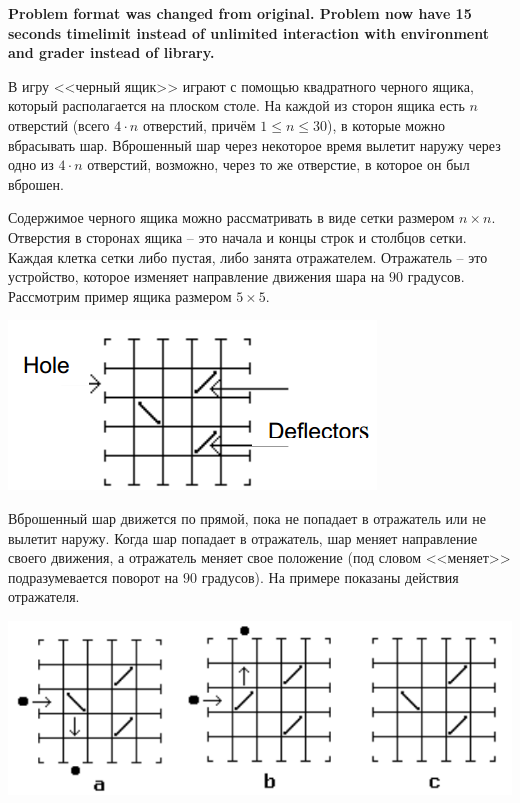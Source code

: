 {\bf Problem format was changed from original. Problem now have 15 seconds timelimit instead of unlimited interaction with environment and grader instead of library. }

В игру <<черный ящик>> играют с помощью квадратного черного ящика, который располагается на плоском столе. На каждой из сторон ящика есть $n$ отверстий (всего $4\cdot n$ отверстий, причём $1 \le n \le 30$), в которые можно вбрасывать шар. Вброшенный шар через некоторое время вылетит наружу через одно из $4\cdot n$ отверстий, возможно, через то же отверстие, в которое он был вброшен.

Содержимое черного ящика можно рассматривать в виде сетки размером $n \times n$. Отверстия в сторонах ящика -- это начала и концы строк и столбцов сетки. Каждая клетка сетки либо пустая, либо занята отражателем. Отражатель -- это устройство, которое изменяет направление движения шара на $90$ градусов. Рассмотрим пример ящика размером $5 \times 5$.

\begin{center}
\includegraphics[bb=0 0 275 120]{blackbox1.png}
\end{center}

Вброшенный шар движется по прямой, пока не попадает в отражатель или не вылетит наружу. Когда шар попадает в отражатель, шар меняет направление своего движения, а отражатель меняет свое положение (под словом <<меняет>> подразумевается поворот на $90$ градусов). На примере показаны действия отражателя.

\begin{center}
\includegraphics[bb=0 0 600 150]{blackbox2.png}
\end{center}

